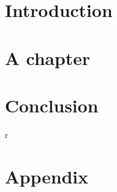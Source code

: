 \providecommand{\main}{.}








{\hypersetup{hidelinks}
	\tableofcontents  %
}

\chapter{Introduction}


\chapter{A chapter}


\chapter{Conclusion}
r

\appendix
\chapter{Appendix}




